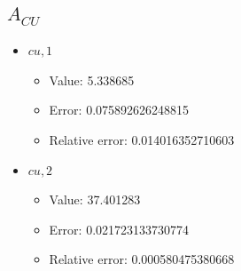 \documentclass{article}%
\begin{document}
\subsection{$A_{CU}$}%
\begin{itemize}%
	\item $\textit{cu},1$%
	\begin{itemize}%
		\item Value: 5.338685%
		\item Error: 0.075892626248815%
		\item Relative error: 0.014016352710603%
	\end{itemize}%
	\item $\textit{cu},2$%
	\begin{itemize}%
		\item Value: 37.401283%
		\item Error: 0.021723133730774%
		\item Relative error: 0.000580475380668%
	\end{itemize}%
\end{itemize}%
\end{document}
